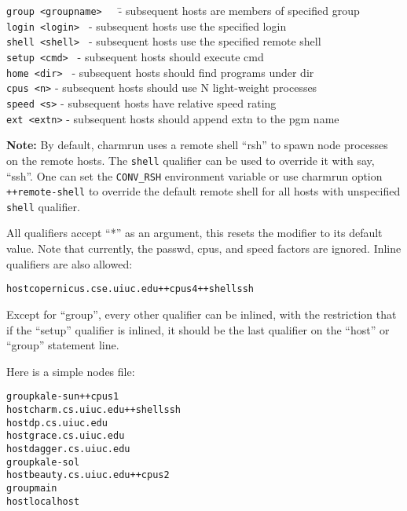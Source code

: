 \documentclass[10pt]{article}
\begin{document}
\begin{tabbing}
{\tt group <groupname>}~~~\= - subsequent hosts are members of specified group\\
{\tt login <login>  }     \> - subsequent hosts use the specified login\\
{\tt shell <shell>  }     \> - subsequent hosts use the specified remote 
shell\\
{\tt setup <cmd>  }       \> - subsequent hosts should execute cmd\\
{\tt home <dir> }         \> - subsequent hosts should find programs under dir\\
{\tt cpus <n>}            \> - subsequent hosts should use N light-weight processes\\
{\tt speed <s>}           \> - subsequent hosts have relative speed rating\\
{\tt ext <extn>}          \> - subsequent hosts should append extn to the pgm name\\
\end{tabbing}

{\bf Note:}
By default, charmrun uses a remote shell ``rsh'' to spawn node processes
on the remote hosts. The {\tt shell} qualifier can be used to override
it with say, ``ssh''. One can set the {\tt CONV\_RSH} environment variable
or use charmrun option {\tt ++remote-shell} to override the default remote 
shell for all hosts with unspecified {\tt shell} qualifier.

All qualifiers accept ``*'' as an argument, this resets the modifier to
its default value.  Note that currently, the passwd, cpus, and speed
factors are ignored.  Inline qualifiers are also allowed:

\begin{alltt}
host copernicus.cse.uiuc.edu ++cpus 4 ++shell ssh
\end{alltt}

Except for ``group'', every other qualifier can be inlined, with the
restriction that if the ``setup'' qualifier is inlined, it should be
the last qualifier on the ``host'' or ``group'' statement line.

Here is a simple nodes file:

\begin{alltt}
        group kale-sun ++cpus 1
          host charm.cs.uiuc.edu ++shell ssh
          host dp.cs.uiuc.edu
          host grace.cs.uiuc.edu
          host dagger.cs.uiuc.edu
        group kale-sol
          host beauty.cs.uiuc.edu ++cpus 2
        group main
          host localhost
\end{alltt}
\end{document}
